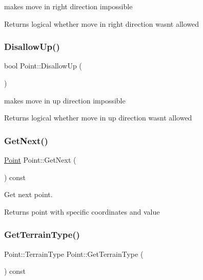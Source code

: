 makes move in right direction impossible 

\begin{DoxyReturn}{Returns}
logical whether move in right direction wasn\textquotesingle{}t allowed 
\end{DoxyReturn}
\mbox{\label{class_point_a61ee1b109f1edf11cfa37b16e9113e9f}} 
\subsubsection{\texorpdfstring{Disallow\+Up()}{DisallowUp()}}
{\footnotesize\ttfamily bool Point\+::\+Disallow\+Up (\begin{DoxyParamCaption}{ }\end{DoxyParamCaption})}



makes move in up direction impossible 

\begin{DoxyReturn}{Returns}
logical whether move in up direction wasn\textquotesingle{}t allowed 
\end{DoxyReturn}
\mbox{\label{class_point_ad6451227b0442af26b62280f7fe33eac}} 
\subsubsection{\texorpdfstring{Get\+Next()}{GetNext()}}
{\footnotesize\ttfamily \mbox{\hyperlink{class_point}{Point}} Point\+::\+Get\+Next (\begin{DoxyParamCaption}{ }\end{DoxyParamCaption}) const}



Get next point. 

\begin{DoxyReturn}{Returns}
point with specific coordinates and value 
\end{DoxyReturn}
\mbox{\label{class_point_af1d2f948542642bdeb25eebec21ef06f}} 
\subsubsection{\texorpdfstring{Get\+Terrain\+Type()}{GetTerrainType()}}
{\footnotesize\ttfamily Point\+::\+Terrain\+Type Point\+::\+Get\+Terrain\+Type (\begin{DoxyParamCaption}{ }\end{DoxyParamCaption}) const}



